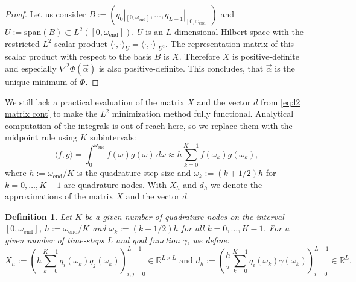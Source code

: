 \documentclass[a4paper,11pt,bibliography=totoc,listof=totoc,headinclude=true,cleardoublepage=empty,oneside]{scrbook}
\newtheorem{definition}[theorem]{Definition}
\newcommand{\R}{\mathbb{R}}
\newcommand{\e}{\mathrm{end}}
\begin{document}
\begin{proof}
    Let us consider $B:=\left(q_0|_{[0, \omega_\e]}, \dots, q_{L-1}|_{[0, \omega_\e]}\right)$ and $U := \mathrm{span}(B) \subset L^2\left([0, \omega_\e]\right)$. $U$ is an $L$-dimensional Hilbert space with the restricted $L^2$ scalar product $\langle \cdot, \cdot \rangle_U = \langle \cdot , \cdot \rangle|_{U^2}$. The representation matrix of this scalar product with respect to the basis $B$ is $X$. Therefore $X$ is positive-definite and especially $\nabla^2\Phi(\Vec{\alpha})$ is also positive-definite. This concludes, that $\Vec{\alpha}$ is the unique minimum of $\Phi$. 
\end{proof}

We still lack a practical evaluation of the matrix $X$ and the vector $d$ from \eqref{eq:l2 matrix cont} to make the $L^2$ minimization method fully functional. Analytical computation of the integrals is out of reach here, so we replace them with the midpoint rule using $K$ subintervals:
\begin{equation*}
    \langle f, g \rangle = \int_0^{\omega_\e} f(\omega) g(\omega) \, d\omega \approx h \sum_{k=0}^{K-1} f(\omega_k)g(\omega_k), 
\end{equation*}
where $h := \omega_\e/K$ is the quadrature step-size and $\omega_k := (k+1/2)h$ for $k = 0, \dots, K-1$ are quadrature nodes. With $X_h$ and $d_h$ we denote the approximations of the matrix $X$ and the vector $d$.

\begin{definition}\label{def:Xh}
    Let $K$ be a given number of quadrature nodes on the interval $[0, \omega_\e]$, $h := \omega_\e/K$ and $\omega_k := (k+1/2)h$ for all $k = 0, \dots, K-1$. For a given number of time-steps $L$ and goal function $\gamma$, we define:
    \begin{equation*}
        X_h := \left(h\sum_{k=0}^{K-1} q_i(\omega_k)q_j(\omega_k)\right)_{i,j = 0}^{L-1} \in \R^{L\times L} \text{ and } d_h := \left(\frac{h}{\tau}\sum_{k=0}^{K-1} q_i(\omega_k)\gamma(\omega_k) \right)_{i=0}^{L-1} \in \R^L.
    \end{equation*}
\end{definition}
\end{document}
